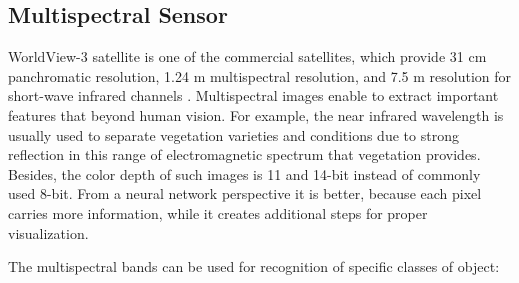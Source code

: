 \documentclass[10pt,twocolumn,letterpaper]{article}
\begin{document}
\subsection{Multispectral Sensor}
\label{section:sensor}

WorldView-3 satellite is one of the commercial satellites, which provide 31 cm panchromatic resolution, 1.24 m multispectral resolution, and 7.5 m resolution for short-wave infrared channels \cite{bands}. Multispectral images enable to extract important features that beyond human vision. For example, the near infrared wavelength is usually used to separate vegetation varieties and conditions due to strong reflection in this range of electromagnetic spectrum that vegetation provides. Besides, the color depth of such images is 11 and 14-bit instead of commonly used 8-bit. From a neural network perspective it is better, because each pixel carries more information, while it creates additional steps for proper visualization.

The multispectral bands can be used for recognition of specific classes of object:
\end{document}
